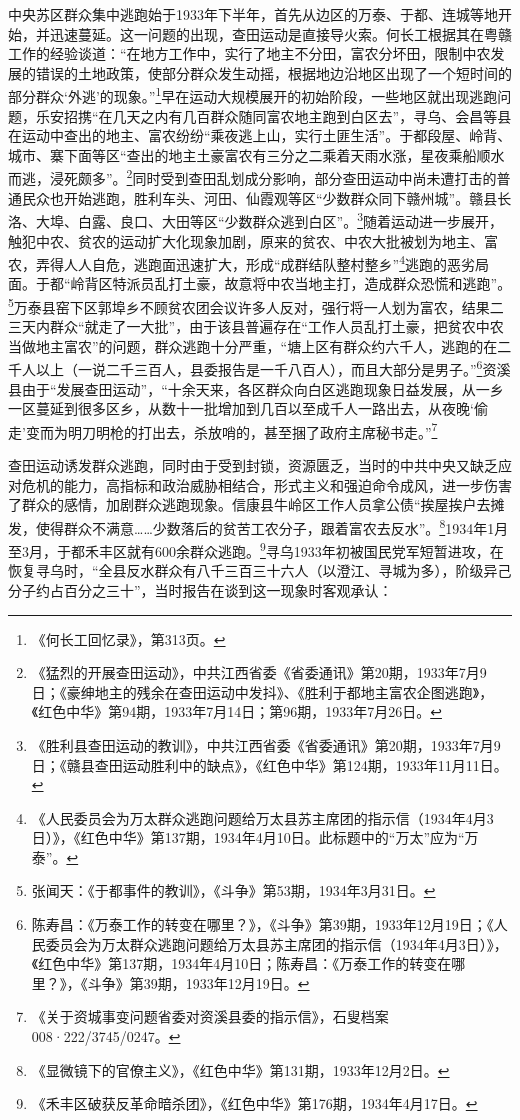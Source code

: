 中央苏区群众集中逃跑始于1933年下半年，首先从边区的万泰、于都、连城等地开始，并迅速蔓延。这一问题的出现，查田运动是直接导火索。何长工根据其在粤赣工作的经验谈道：“在地方工作中，实行了地主不分田，富农分坏田，限制中农发展的错误的土地政策，使部分群众发生动摇，根据地边沿地区出现了一个短时间的部分群众‘外逃’的现象。”\footnote{《何长工回忆录》，第313页。}早在运动大规模展开的初始阶段，一些地区就出现逃跑问题，乐安招携“在几天之内有几百群众随同富农地主跑到白区去”，寻乌、会昌等县在运动中查出的地主、富农纷纷“乘夜逃上山，实行土匪生活”。于都段屋、岭背、城市、寨下面等区“查出的地主土豪富农有三分之二乘着天雨水涨，星夜乘船顺水而逃，浸死颇多”。\footnote{《猛烈的开展查田运动》，中共江西省委《省委通讯》第20期，1933年7月9日；《豪绅地主的残余在查田运动中发抖》、《胜利于都地主富农企图逃跑》，《红色中华》第94期，1933年7月14日；第96期，1933年7月26日。}同时受到查田乱划成分影响，部分查田运动中尚未遭打击的普通民众也开始逃跑，胜利车头、河田、仙霞观等区“少数群众同下赣州城”。赣县长洛、大埠、白露、良口、大田等区“少数群众逃到白区”。\footnote{《胜利县查田运动的教训》，中共江西省委《省委通讯》第20期，1933年7月9日；《赣县查田运动胜利中的缺点》，《红色中华》第124期，1933年11月11日。}随着运动进一步展开，触犯中农、贫农的运动扩大化现象加剧，原来的贫农、中农大批被划为地主、富农，弄得人人自危，逃跑面迅速扩大，形成“成群结队整村整乡”\footnote{《人民委员会为万太群众逃跑问题给万太县苏主席团的指示信（1934年4月3日）》，《红色中华》第137期，1934年4月10日。此标题中的“万太”应为“万泰”。}逃跑的恶劣局面。于都“岭背区特派员乱打土豪，故意将中农当地主打，造成群众恐慌和逃跑”。\footnote{张闻天：《于都事件的教训》，《斗争》第53期，1934年3月31日。}万泰县窑下区郭埠乡不顾贫农团会议许多人反对，强行将一人划为富农，结果二三天内群众“就走了一大批”，由于该县普遍存在“工作人员乱打土豪，把贫农中农当做地主富农”的问题，群众逃跑十分严重，“塘上区有群众约六千人，逃跑的在二千人以上（一说二千三百人，县委报告是一千八百人），而且大部分是男子。”\footnote{陈寿昌：《万泰工作的转变在哪里？》，《斗争》第39期，1933年12月19日；《人民委员会为万太群众逃跑问题给万太县苏主席团的指示信（1934年4月3日）》，《红色中华》第137期，1934年4月10日；陈寿昌：《万泰工作的转变在哪里？》，《斗争》第39期，1933年12月19日。}资溪县由于“发展查田运动”，“十余天来，各区群众向白区逃跑现象日益发展，从一乡一区蔓延到很多区乡，从数十一批增加到几百以至成千人一路出去，从夜晚‘偷走’变而为明刀明枪的打出去，杀放哨的，甚至捆了政府主席秘书走。”\footnote{《关于资城事变问题省委对资溪县委的指示信》，石叟档案008·222/3745/0247。}


查田运动诱发群众逃跑，同时由于受到封锁，资源匮乏，当时的中共中央又缺乏应对危机的能力，高指标和政治威胁相结合，形式主义和强迫命令成风，进一步伤害了群众的感情，加剧群众逃跑现象。信康县牛岭区工作人员拿公债“挨屋挨户去摊发，使得群众不满意……少数落后的贫苦工农分子，跟着富农去反水”。\footnote{《显微镜下的官僚主义》，《红色中华》第131期，1933年12月2日。}1934年1月至3月，于都禾丰区就有600余群众逃跑。\footnote{《禾丰区破获反革命暗杀团》，《红色中华》第176期，1934年4月17日。}寻乌1933年初被国民党军短暂进攻，在恢复寻乌时，“全县反水群众有八千三百三十六人（以澄江、寻城为多），阶级异己分子约占百分之三十”，当时报告在谈到这一现象时客观承认：

